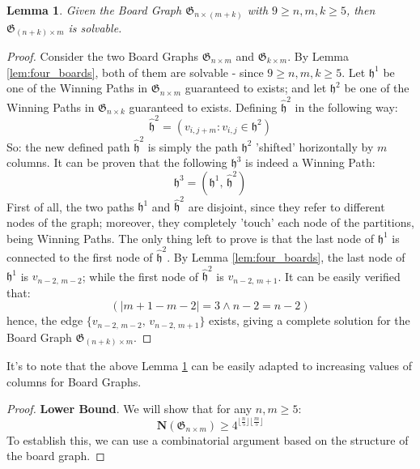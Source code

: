 \documentclass[conference]{IEEEtran}
\newtheorem{lemma}{Lemma}[section]
\begin{document}
\begin{lemma} \label{lem:tiling}
    Given the Board Graph $\mathfrak{G}_{n \times (m + k)}$ with $9 \ge n, m, k \ge 5$, then $\mathfrak{G}_{(n + k) \times m}$ is solvable.
\end{lemma}
\begin{proof}
    Consider the two Board Graphs $\mathfrak{G}_{n \times m}$ and $\mathfrak{G}_{k \times m}$.
    By Lemma \ref{lem:four_boards}, both of them are solvable - since $9 \ge n, m, k \ge 5$.
    Let $\mathfrak{h}^1$ be one of the Winning Paths in $\mathfrak{G}_{n \times m}$ guaranteed to exists;
        and let $\mathfrak{h}^2$ be one of the Winning Paths in $\mathfrak{G}_{n \times k}$ guaranteed to exists.
    Defining $\hat{\mathfrak{h}}^2$ in the following way:
    $$
        \hat{\mathfrak{h}}^2 = (v_{i, j + m} : v_{i,j} \in \mathfrak{h}^2)
    $$
    So: the new defined path $\hat{\mathfrak{h}}^2$ is simply the path $\mathfrak{h}^2$ 'shifted' horizontally by $m$ columns.
        It can be proven that the following $\mathfrak{h}^3$ is indeed a Winning Path:
    $$
        \mathfrak{h}^3 = (\mathfrak{h}^1,\,\hat{\mathfrak{h}}^2)
    $$
    First of all, the two paths $\mathfrak{h}^1$ and $\hat{\mathfrak{h}}^2$ are disjoint, since they refer to different nodes of the graph; moreover, they completely 'touch' each node of the partitions, being Winning Paths.
    The only thing left to prove is that the last node of $\mathfrak{h}^1$ is connected to the first node of $\hat{\mathfrak{h}}^2$.
    By Lemma \ref{lem:four_boards}, the last node of $\mathfrak{h}^1$ is $v_{n-2,\,m-2}$; while the first node of $\hat{\mathfrak{h}}^2$ is $v_{n-2,\,m+1}$.
    It can be easily verified that:
    $$
        (|m+1 - m-2| = 3 \land n-2 = n-2)
    $$
    hence, the edge $\{v_{n-2,\,m-2},\,v_{n-2,\,m+1}\}$ exists, giving a complete solution for the Board Graph $\mathfrak{G}_{(n + k) \times m}$.
\end{proof}

It's to note that the above Lemma \ref{lem:tiling} can be easily adapted to increasing values of columns for Board Graphs.

\vspace{0.6em}
\begin{proof}
    \textbf{Lower Bound}. We will show that for any $n, m \ge 5$:
    $$
        \mathbf{N}(\mathfrak{G}_{n \times m}) \ge 4^{\lfloor{\frac{n}{5}}\rfloor \lfloor{\frac{m}{5}}\rfloor}
    $$
    To establish this, we can use a combinatorial argument based on the structure of the board graph.
\end{proof}
\end{document}

